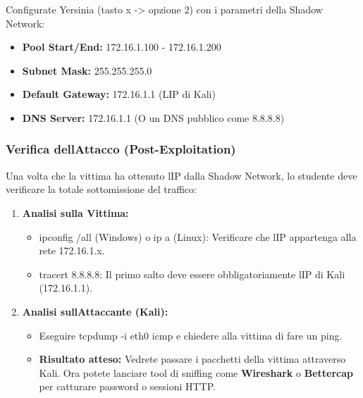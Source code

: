 \documentclass[11pt,a4paper]{article}
\begin{document}
Configurate Yersinia (tasto x -\textgreater{} opzione 2) con i parametri
della Shadow Network:

\begin{itemize}
\item
  \textbf{Pool Start/End:} 172.16.1.100 - 172.16.1.200
\item
  \textbf{Subnet Mask:} 255.255.255.0
\item
  \textbf{Default Gateway:} 172.16.1.1 (L\textquotesingle IP di Kali)
\item
  \textbf{DNS Server:} 172.16.1.1 (O un DNS pubblico come 8.8.8.8)
\end{itemize}

\subsubsection{Verifica dell\textquotesingle Attacco
(Post-Exploitation)}\label{verifica-dellattacco-post-exploitation}

Una volta che la vittima ha ottenuto l\textquotesingle IP dalla Shadow
Network, lo studente deve verificare la totale sottomissione del
traffico:

\begin{enumerate}
\def\labelenumi{\arabic{enumi}.}
\item
  \textbf{Analisi sulla Vittima:}

  \begin{itemize}
  \item
    ipconfig /all (Windows) o ip a (Linux): Verificare che
    l\textquotesingle IP appartenga alla rete 172.16.1.x.
  \item
    tracert 8.8.8.8: Il primo salto deve essere obbligatoriamente
    l\textquotesingle IP di Kali (172.16.1.1).
  \end{itemize}
\item
  \textbf{Analisi sull\textquotesingle Attaccante (Kali):}

  \begin{itemize}
  \item
    Eseguire tcpdump -i eth0 icmp e chiedere alla vittima di fare un
    ping.
  \item
    \textbf{Risultato atteso:} Vedrete passare i pacchetti della vittima
    attraverso Kali. Ora potete lanciare tool di sniffing come
    \textbf{Wireshark} o \textbf{Bettercap} per catturare password o
    sessioni HTTP.
  \end{itemize}
\end{enumerate}
\end{document}
